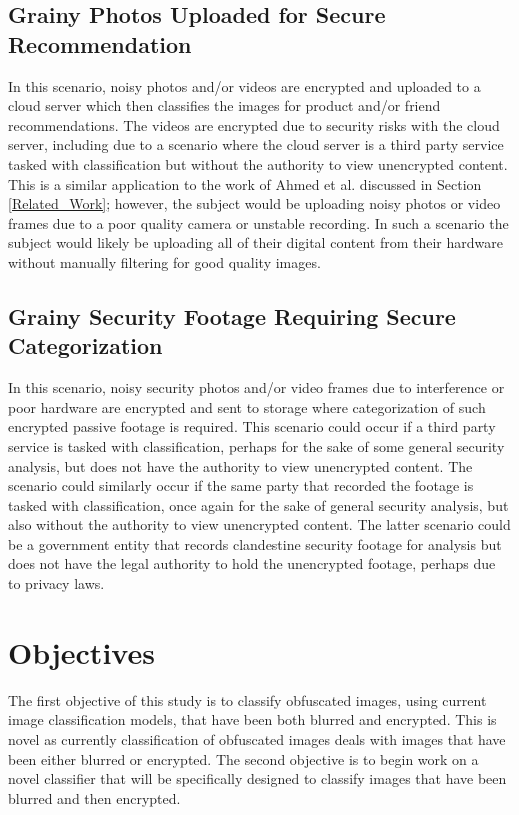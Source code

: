 \documentclass[12pt, titlepage]{article}
\begin{document}
\subsection{Grainy Photos Uploaded for Secure Recommendation}
In this scenario, noisy photos and/or videos are encrypted and uploaded to a cloud server which then classifies the images for product and/or friend recommendations. The videos are encrypted due to security risks with the cloud server, including due to a scenario where the cloud server is a third party service tasked with classification but without the authority to view unencrypted content. This is a similar application to the work of Ahmed et al. discussed in Section \ref{Related_Work}; however, the subject would be uploading noisy photos or video frames due to a poor quality camera or unstable recording. In such a scenario the subject would likely be uploading all of their digital content from their hardware without manually filtering for good quality images.

\subsection{Grainy Security Footage Requiring Secure Categorization}
In this scenario, noisy security photos and/or video frames due to interference or poor hardware are encrypted and sent to storage where categorization of such encrypted passive footage is required. This scenario could occur if a third party service is tasked with classification, perhaps for the sake of some general security analysis, but does not have the authority to view unencrypted content. The scenario could similarly occur if the same party that recorded the footage is tasked with classification, once again for the sake of general security analysis, but also without the authority to view unencrypted content. The latter scenario could be a government entity that records clandestine security footage for analysis but does not have the legal authority to hold the unencrypted footage, perhaps due to privacy laws. 


\section{Objectives}\label{objectives}
The first objective of this study is to classify obfuscated images, using current image classification models, that have been both blurred and encrypted. This is novel as currently classification of obfuscated images deals with images that have been either blurred or encrypted. The second objective is to begin work on a novel classifier that will be specifically designed to classify images that have been blurred and then encrypted.
\end{document}
